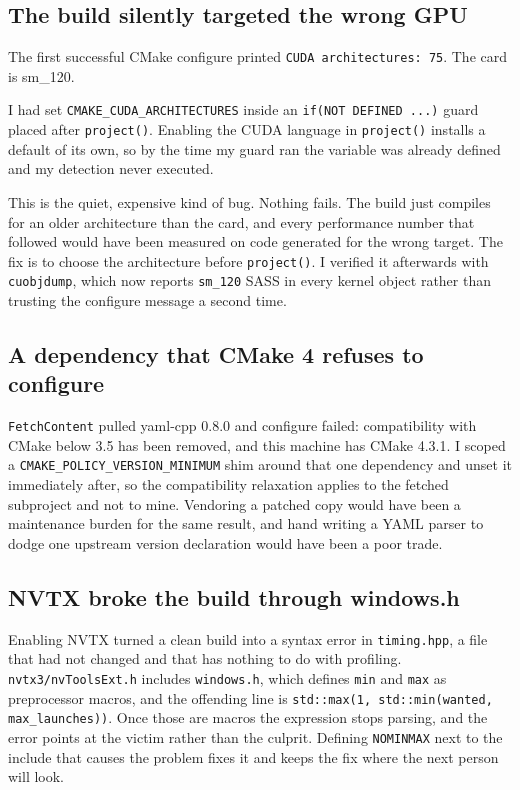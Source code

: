 ﻿\documentclass[11pt]{article}
\begin{document}
\subsection{The build silently targeted the wrong GPU}

The first successful CMake configure printed \texttt{CUDA architectures: 75}. The
card is sm\_120.

I had set \texttt{CMAKE\_CUDA\_ARCHITECTURES} inside an
\texttt{if(NOT DEFINED ...)} guard placed after \texttt{project()}. Enabling the
CUDA language in \texttt{project()} installs a default of its own, so by the time
my guard ran the variable was already defined and my detection never executed.

This is the quiet, expensive kind of bug. Nothing fails. The build just compiles
for an older architecture than the card, and every performance number that
followed would have been measured on code generated for the wrong target. The fix
is to choose the architecture before \texttt{project()}. I verified it afterwards
with \texttt{cuobjdump}, which now reports \texttt{sm\_120} SASS in every kernel
object rather than trusting the configure message a second time.

\subsection{A dependency that CMake 4 refuses to configure}

\texttt{FetchContent} pulled yaml-cpp 0.8.0 and configure failed: compatibility
with CMake below 3.5 has been removed, and this machine has CMake 4.3.1. I scoped
a \texttt{CMAKE\_POLICY\_VERSION\_MINIMUM} shim around that one dependency and
unset it immediately after, so the compatibility relaxation applies to the fetched
subproject and not to mine. Vendoring a patched copy would have been a
maintenance burden for the same result, and hand writing a YAML parser to dodge
one upstream version declaration would have been a poor trade.

\subsection{NVTX broke the build through windows.h}

Enabling NVTX turned a clean build into a syntax error in
\texttt{timing.hpp}, a file that had not changed and that has nothing to do with
profiling. \texttt{nvtx3/nvToolsExt.h} includes \texttt{windows.h}, which defines
\texttt{min} and \texttt{max} as preprocessor macros, and the offending line is
\texttt{std::max(1, std::min(wanted, max\_launches))}. Once those are macros the
expression stops parsing, and the error points at the victim rather than the
culprit. Defining \texttt{NOMINMAX} next to the include that causes the problem
fixes it and keeps the fix where the next person will look.
\end{document}

